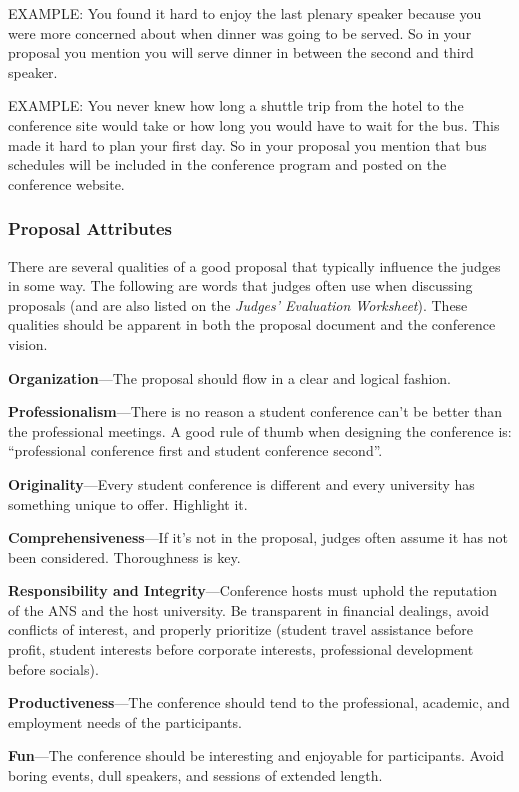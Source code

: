 \documentclass[12pt]{article}
\begin{document}
EXAMPLE: You found it hard to enjoy the last plenary speaker because you were more
concerned about when dinner was going to be served. So in your proposal you mention
you will serve dinner in between the second and third speaker.

EXAMPLE: You never knew how long a shuttle trip from the hotel to the conference
site would take or how long you would have to wait for the bus. This made it hard to
plan your first day. So in your proposal you mention that bus schedules will be included
in the conference program and posted on the conference website.

\subsubsection{Proposal Attributes}
There are several qualities of a good proposal that typically influence the judges in some way. The following are
words that judges often use when discussing proposals (and are also listed on the \emph{Judges' Evaluation Worksheet}). These qualities should be
apparent in both the proposal document and the conference vision.

\textbf{Organization}---The proposal should flow in a clear and logical fashion.

\textbf{Professionalism}---There is no reason a student conference can’t be better than the professional meetings. A good rule of thumb when designing the conference is: “professional conference first and student conference second”.

\textbf{Originality}---Every student conference is different and every university has something unique to offer. Highlight it.

\textbf{Comprehensiveness}---If it’s not in the proposal, judges often assume it has not been considered. Thoroughness is key.

\textbf{Responsibility and Integrity}---Conference hosts must uphold the reputation of the ANS and the host university. Be transparent in financial dealings, avoid conflicts of interest, and properly prioritize (student travel assistance before profit, student interests before corporate
interests, professional development before socials).

\textbf{Productiveness}---The conference should tend to the professional, academic, and employment needs of the participants.

\textbf{Fun}---The conference should be interesting and enjoyable for participants. Avoid boring events, dull speakers, and sessions of extended length.
\end{document}
